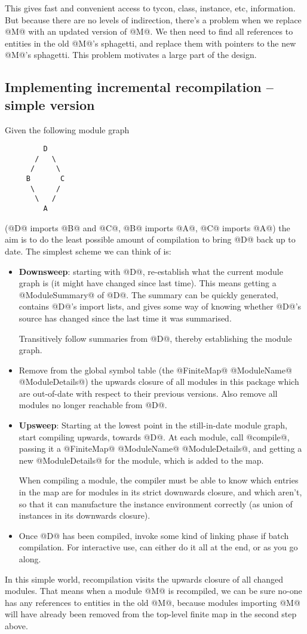\documentclass[11pt]{article}
\begin{document}
This gives fast and convenient access to tycon, class, instance,
etc, information.  But because there are no levels of indirection,
there's a problem when we replace @M@ with an updated version of @M@.
We then need to find all references to entities in the old @M@'s
sphagetti, and replace them with pointers to the new @M@'s sphagetti.
This problem motivates a large part of the design.



\subsection{Implementing incremental recompilation -- simple version}
Given the following module graph
\begin{verbatim}
         D
       /   \
      /     \
     B       C
      \     /
       \   /
         A
\end{verbatim}
(@D@ imports @B@ and @C@, @B@ imports @A@, @C@ imports @A@) the aim is to do the
least possible amount of compilation to bring @D@ back up to date.  The
simplest scheme we can think of is:
\begin{itemize}
\item {\bf Downsweep}: 
  starting with @D@, re-establish what the current module graph is
  (it might have changed since last time).  This means getting a
  @ModuleSummary@ of @D@.  The summary can be quickly generated,
  contains @D@'s import lists, and gives some way of knowing whether
  @D@'s source has changed since the last time it was summarised.

  Transitively follow summaries from @D@, thereby establishing the
  module graph.
\item
  Remove from the global symbol table (the @FiniteMap@ @ModuleName@
  @ModuleDetails@) the upwards closure of all modules in this package
  which are out-of-date with respect to their previous versions.  Also
  remove all modules no longer reachable from @D@.
\item {\bf Upsweep}:
  Starting at the lowest point in the still-in-date module graph,
  start compiling upwards, towards @D@.  At each module, call
  @compile@, passing it a @FiniteMap@ @ModuleName@ @ModuleDetails@,
  and getting a new @ModuleDetails@ for the module, which is added to
  the map.

  When compiling a module, the compiler must be able to know which
  entries in the map are for modules in its strict downwards closure,
  and which aren't, so that it can manufacture the instance
  environment correctly (as union of instances in its downwards
  closure).
\item
  Once @D@ has been compiled, invoke some kind of linking phase
  if batch compilation.  For interactive use, can either do it all
  at the end, or as you go along.
\end{itemize}
In this simple world, recompilation visits the upwards closure of
all changed modules.  That means when a module @M@ is recompiled,
we can be sure no-one has any references to entities in the old @M@,
because modules importing @M@ will have already been removed from the 
top-level finite map in the second step above.
\end{document}
